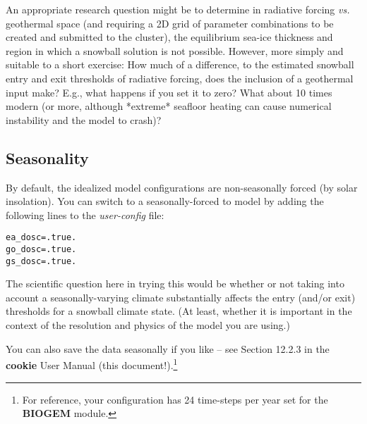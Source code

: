 An appropriate research question might be to determine in radiative forcing \textit{vs.} geothermal space (and requiring a 2D grid of parameter combinations to be created and submitted to the cluster), the equilibrium sea-ice thickness and region in which a snowball solution is not possible. However, more simply and suitable to a short exercise: How much of a difference, to the estimated snowball entry and exit thresholds of radiative forcing, does the inclusion of a geothermal input make? E.g., what happens if you set it to zero? What about 10 times modern (or more, although *extreme* seafloor heating can cause numerical instability and the model to crash)?


\subsection{Seasonality}

By default, the idealized model configurations are non-seasonally forced (by solar insolation). You can switch to a seasonally-forced to model by adding the following lines to the \textit{user-config} file:

\vspace{-3mm}\small\begin{verbatim}
ea_dosc=.true.
go_dosc=.true.
gs_dosc=.true.
\end{verbatim}\normalsize\vspace{-2mm}

\noindent The scientific question here in trying this would be whether or not taking into account a seasonally-varying climate substantially affects the entry (and/or exit) thresholds for a snowball climate state. (At least, whether it is important in the context of the resolution and physics of the model you are using.)

You can also save the data seasonally if you like – see Section 12.2.3 in the \textbf{cookie} User Manual (this document!).\footnote{For reference, your configuration has 24 time-steps per year set for the \textbf{BIOGEM} module.}

